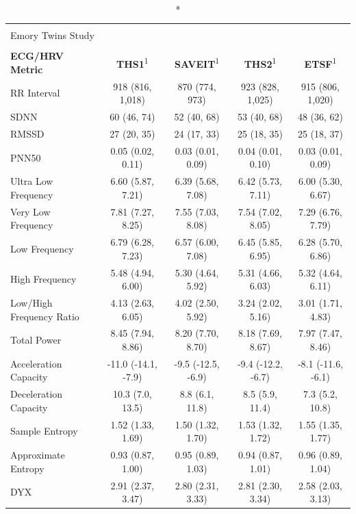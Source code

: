 \documentclass[
  11pt,
  openany]{book}
\begin{document}
\captionsetup[table]{labelformat=empty,skip=1pt}
\begin{longtable}{lcccc}
\caption*{
\large Description of HRV\\ 
\small Emory Twins Study\\ 
} \\ 
\toprule
\textbf{ECG/HRV Metric} & \textbf{THS1}\textsuperscript{1} & \textbf{SAVEIT}\textsuperscript{1} & \textbf{THS2}\textsuperscript{1} & \textbf{ETSF}\textsuperscript{1} \\ 
\midrule
RR Interval & 918 (816, 1,018) & 870 (774, 973) & 923 (828, 1,025) & 915 (806, 1,020) \\ 
SDNN & 60 (46, 74) & 52 (40, 68) & 53 (40, 68) & 48 (36, 62) \\ 
RMSSD & 27 (20, 35) & 24 (17, 33) & 25 (18, 35) & 25 (18, 37) \\ 
PNN50 & 0.05 (0.02, 0.11) & 0.03 (0.01, 0.09) & 0.04 (0.01, 0.10) & 0.03 (0.01, 0.09) \\ 
Ultra Low Frequency & 6.60 (5.87, 7.21) & 6.39 (5.68, 7.08) & 6.42 (5.73, 7.11) & 6.00 (5.30, 6.67) \\ 
Very Low Frequency & 7.81 (7.27, 8.25) & 7.55 (7.03, 8.08) & 7.54 (7.02, 8.05) & 7.29 (6.76, 7.79) \\ 
Low Frequency & 6.79 (6.28, 7.23) & 6.57 (6.00, 7.08) & 6.45 (5.85, 6.95) & 6.28 (5.70, 6.86) \\ 
High Frequency & 5.48 (4.94, 6.00) & 5.30 (4.64, 5.92) & 5.31 (4.66, 6.03) & 5.32 (4.64, 6.11) \\ 
Low/High Frequency Ratio & 4.13 (2.63, 6.05) & 4.02 (2.50, 5.92) & 3.24 (2.02, 5.16) & 3.01 (1.71, 4.83) \\ 
Total Power & 8.45 (7.94, 8.86) & 8.20 (7.70, 8.70) & 8.18 (7.69, 8.67) & 7.97 (7.47, 8.46) \\ 
Acceleration Capacity & -11.0 (-14.1, -7.9) & -9.5 (-12.5, -6.9) & -9.4 (-12.2, -6.7) & -8.1 (-11.6, -6.1) \\ 
Deceleration Capacity & 10.3 (7.0, 13.5) & 8.8 (6.1, 11.8) & 8.5 (5.9, 11.4) & 7.3 (5.2, 10.8) \\ 
Sample Entropy & 1.52 (1.33, 1.69) & 1.50 (1.32, 1.70) & 1.53 (1.32, 1.72) & 1.55 (1.35, 1.77) \\ 
Approximate Entropy & 0.93 (0.87, 1.00) & 0.95 (0.89, 1.03) & 0.94 (0.87, 1.01) & 0.96 (0.89, 1.04) \\ 
DYX & 2.91 (2.37, 3.47) & 2.80 (2.31, 3.33) & 2.81 (2.30, 3.34) & 2.58 (2.03, 3.13) \\ 
\bottomrule
\end{longtable}
\end{document}
